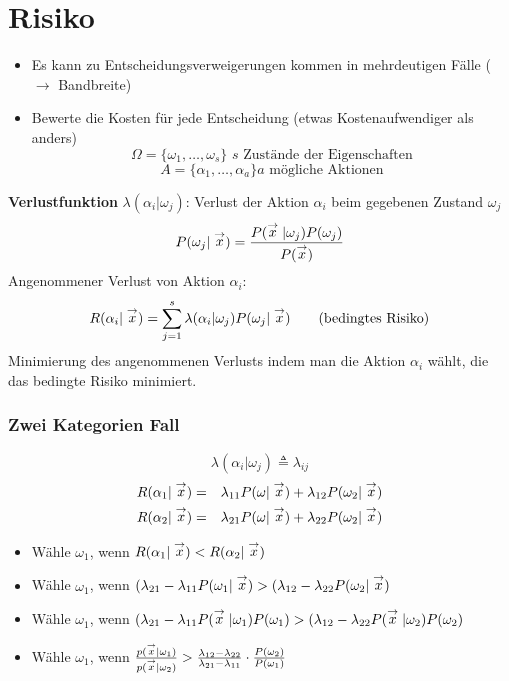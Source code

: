 \section{Risiko}

\begin{itemize}
\item Es kann zu Entscheidungsverweigerungen kommen in mehrdeutigen Fälle ($\to$ Bandbreite)
\item Bewerte die Kosten für jede Entscheidung (etwas Kostenaufwendiger als anders) $$\Omega = \{ \omega_1, \dots, \omega_s \} \,\, s \textrm{ Zustände der Eigenschaften}$$ $$A = \{ \alpha_1, \dots, \alpha_a \} a \textrm{ mögliche Aktionen}$$
\end{itemize}

\textbf{Verlustfunktion}
$\lambda(\alpha_i | \omega_j)$: Verlust der Aktion $\alpha_i$ beim gegebenen Zustand $\omega_j$ $$P(\omega_j | \stackrel{\to}{x}) = \frac{P(\stackrel{\to}{x} | \omega_j) P(\omega_j)}{P(\stackrel{\to}{x})}$$
Angenommener Verlust von Aktion $\alpha_i$: $$R(\alpha_i | \stackrel{\to}{x}) = \sum\limits_{j=1}^s \lambda(\alpha_i | \omega_j) P(\omega_j | \stackrel{\to}{x}) \qquad \textrm{(bedingtes Risiko)}$$
Minimierung des angenommenen Verlusts indem man die Aktion $\alpha_i$ wählt, die das bedingte Risiko minimiert.
\subsubsection*{Zwei Kategorien Fall}
$$\lambda(\alpha_i | \omega_j) \triangleq \lambda_{ij}$$
\begin{eqnarray*}
R(\alpha_1 | \stackrel{\to}{x}) &=& \lambda_{11} P(\omega | \stackrel{\to}{x}) + \lambda_{12} P(\omega_2 | \stackrel{\to}{x}) \\
R(\alpha_2 | \stackrel{\to}{x}) &=& \lambda_{21} P(\omega | \stackrel{\to}{x}) + \lambda_{22} P(\omega_2 | \stackrel{\to}{x}) \\
\end{eqnarray*}

\begin{itemize}
\item Wähle $\omega_1$, wenn $R(\alpha_1 | \stackrel{\to}{x}) < R(\alpha_2 | \stackrel{\to}{x})$
\item Wähle $\omega_1$, wenn $(\lambda_{21} - \lambda_{11} P(\omega_1 | \stackrel{\to}{x}) > (\lambda_{12} - \lambda_{22} P(\omega_2 | \stackrel{\to}{x})$
\item Wähle $\omega_1$, wenn $(\lambda_{21} - \lambda_{11} P(\stackrel{\to}{x} | \omega_1)P(\omega_1) > (\lambda_{12} - \lambda_{22} P(\stackrel{\to}{x} | \omega_2) P(\omega_2)$
\item Wähle $\omega_1$, wenn $\frac{p(\stackrel{\to}{x} | \omega_1)}{p(\stackrel{\to}{x} | \omega_2)} > \frac{\lambda_{12} - \lambda_{22}}{\lambda_{21} - \lambda_{11}} \cdot \frac{P(\omega_2)}{P(\omega_1)}$
\end{itemize}


